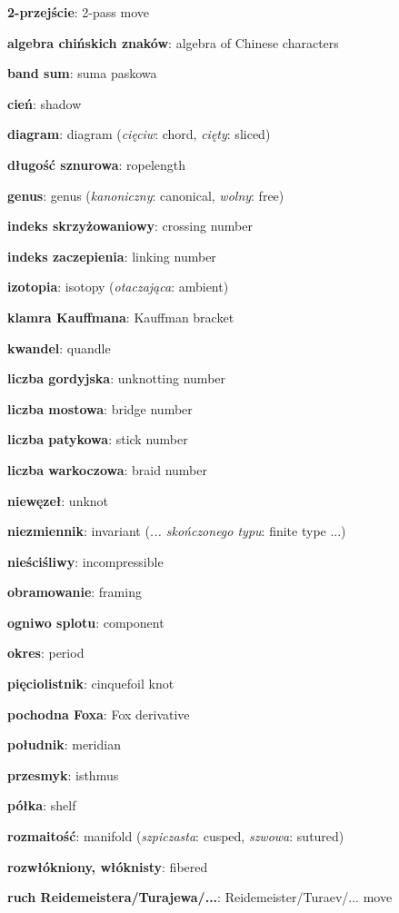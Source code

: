 \item \textbf{2-przejście}: 2-pass move
\item \textbf{algebra chińskich znaków}: algebra of Chinese characters
\item \textbf{band sum}: suma paskowa
\item \textbf{cień}: shadow
\item \textbf{diagram}: diagram
(\emph{cięciw}: chord, \emph{cięty}: sliced)
\item \textbf{długość sznurowa}: ropelength
\item \textbf{genus}: genus
(\emph{kanoniczny}: canonical, \emph{wolny}: free)
\item \textbf{indeks skrzyżowaniowy}: crossing number
\item \textbf{indeks zaczepienia}: linking number
\item \textbf{izotopia}: isotopy
(\emph{otaczająca}: ambient)
\item \textbf{klamra Kauffmana}: Kauffman bracket
\item \textbf{kwandel}: quandle
\item \textbf{liczba gordyjska}: unknotting number
\item \textbf{liczba mostowa}: bridge number
\item \textbf{liczba patykowa}: stick number
\item \textbf{liczba warkoczowa}: braid number
\item \textbf{niewęzeł}: unknot
\item \textbf{niezmiennik}: invariant
(\emph{... skończonego typu}: finite type ...)
\item \textbf{nieściśliwy}: incompressible
\item \textbf{obramowanie}: framing
\item \textbf{ogniwo splotu}: component
\item \textbf{okres}: period
\item \textbf{pięciolistnik}: cinquefoil knot
\item \textbf{pochodna Foxa}: Fox derivative
\item \textbf{południk}: meridian
\item \textbf{przesmyk}: isthmus
\item \textbf{półka}: shelf
\item \textbf{rozmaitość}: manifold
(\emph{szpiczasta}: cusped, \emph{szwowa}: sutured)
\item \textbf{rozwłókniony, włóknisty}: fibered
\item \textbf{ruch Reidemeistera/Turajewa/...}: Reidemeister/Turaev/... move
